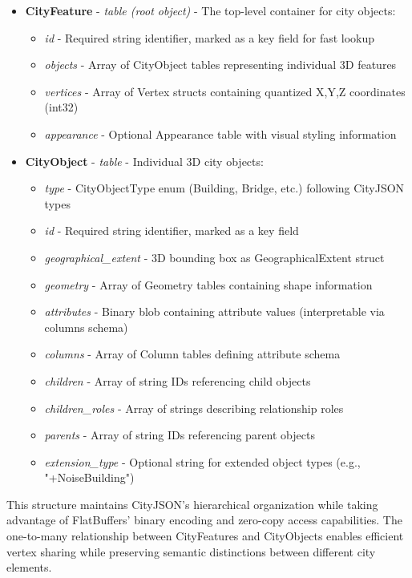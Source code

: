 \begin{itemize}
  \item \textbf{CityFeature} - \textit{table (root object)} - The top-level container for city objects:
    \begin{itemize}
      \item \textit{id} - Required string identifier, marked as a key field for fast lookup
      \item \textit{objects} - Array of CityObject tables representing individual 3D features
      \item \textit{vertices} - Array of Vertex structs containing quantized X,Y,Z coordinates (int32)
      \item \textit{appearance} - Optional Appearance table with visual styling information
    \end{itemize}

  \item \textbf{CityObject} - \textit{table} - Individual 3D city objects:
    \begin{itemize}
      \item \textit{type} - CityObjectType enum (Building, Bridge, etc.) following CityJSON types \citep{cityjson_spec}
      \item \textit{id} - Required string identifier, marked as a key field
      \item \textit{geographical\_extent} - 3D bounding box as GeographicalExtent struct
      \item \textit{geometry} - Array of Geometry tables containing shape information
      \item \textit{attributes} - Binary blob containing attribute values (interpretable via columns schema)
      \item \textit{columns} - Array of Column tables defining attribute schema
      \item \textit{children} - Array of string IDs referencing child objects
      \item \textit{children\_roles} - Array of strings describing relationship roles
      \item \textit{parents} - Array of string IDs referencing parent objects
      \item \textit{extension\_type} - Optional string for extended object types (e.g., "+NoiseBuilding")
    \end{itemize}
\end{itemize}

This structure maintains CityJSON's hierarchical organization while taking advantage of FlatBuffers' binary encoding and zero-copy access capabilities. The one-to-many relationship between CityFeatures and CityObjects enables efficient vertex sharing while preserving semantic distinctions between different city elements.

